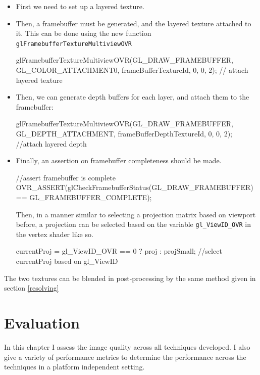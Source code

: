 \documentclass[12pt,a4paper,twoside,openright]{report}
\begin{document}
\begin{itemize}

\item First we need to set up a layered texture.

\item Then, a framebuffer must be generated, and the layered texture attached to it. This can be done using the new function \texttt{glFramebufferTextureMultiviewOVR}
\begin{footcode}
glFramebufferTextureMultiviewOVR(GL_DRAW_FRAMEBUFFER, GL_COLOR_ATTACHMENT0,
				 frameBufferTextureId, 0, 0, 2); // attach layered texture
\end{footcode}
\item Then, we can generate depth buffers for each layer, and attach them to the framebuffer:
\begin{footcode}
glFramebufferTextureMultiviewOVR(GL_DRAW_FRAMEBUFFER, GL_DEPTH_ATTACHMENT,
				 frameBufferDepthTextureId, 0, 0, 2); //attach layered depth
\end{footcode}
\item Finally, an assertion on framebuffer completeness should be made.
\begin{footcode}
//assert framebuffer is complete
OVR_ASSERT(glCheckFramebufferStatus(GL_DRAW_FRAMEBUFFER) == GL_FRAMEBUFFER_COMPLETE);
\end{footcode}

Then, in a manner similar to selecting a projection matrix based on viewport before, a projection can be selected based on the variable \texttt{gl\_ViewID\_OVR} in the vertex shader like so.

\begin{footcode}
currentProj = gl_ViewID_OVR == 0 ? proj : projSmall; //select currentProj based on gl_ViewID 
\end{footcode}

\end{itemize}

The two textures can be blended in post-processing by the same method given in section \ref{resolving}

\chapter{Evaluation}

In this chapter I assess the image quality across all techniques developed. I also give a variety of performance metrics to determine the performance across the techniques in a platform independent setting.
\end{document}
